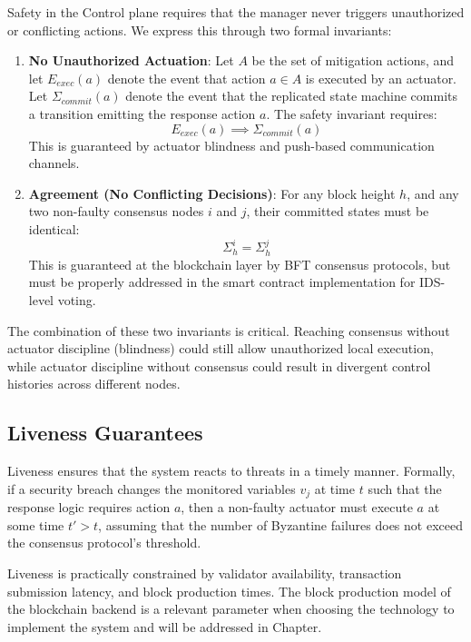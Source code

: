 Safety in the Control plane requires that the manager never triggers unauthorized or conflicting actions. We express this through two formal invariants:

\begin{enumerate}
    \item \textbf{No Unauthorized Actuation}: Let $A$ be the set of mitigation actions, and let $E_{exec}(a)$ denote the event that action $a \in A$ is executed by an actuator. Let $\Sigma_{commit}(a)$ denote the event that the replicated state machine commits a transition emitting the response action $a$. The safety invariant requires:
    \[
    E_{exec}(a) \implies \Sigma_{commit}(a)
    \]
    This is guaranteed by actuator blindness and push-based communication channels.
    \item \textbf{Agreement (No Conflicting Decisions)}: For any block height $h$, and any two non-faulty consensus nodes $i$ and $j$, their committed states must be identical:
    \[
    \Sigma^i_h = \Sigma^j_h
    \]
    This is guaranteed at the blockchain layer by BFT consensus protocols, but must be properly addressed in the smart contract implementation for IDS-level voting.
\end{enumerate}

The combination of these two invariants is critical. Reaching consensus without actuator discipline (blindness) could still allow unauthorized local execution, while actuator discipline without consensus could result in divergent control histories across different nodes.

\subsection{Liveness Guarantees}
\label{subsec:control_liveness}

Liveness ensures that the system reacts to threats in a timely manner. Formally, if a security breach changes the monitored variables $v_j$ at time $t$ such that the response logic requires action $a$, then a non-faulty actuator must execute $a$ at some time $t' > t$, assuming that the number of Byzantine failures does not exceed the consensus protocol's threshold.

Liveness is practically constrained by validator availability, transaction submission latency, and block production times. The block production model of the blockchain backend is a relevant parameter when choosing the technology to implement the system and will be addressed in Chapter. 

